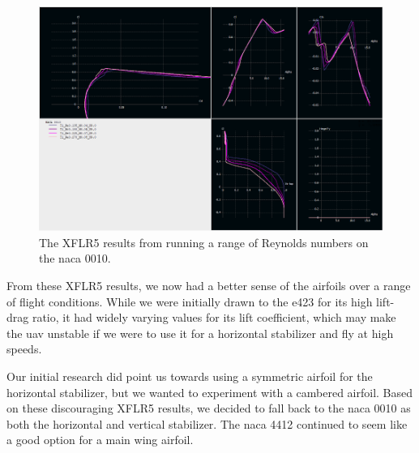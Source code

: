 \begin{figure}[htpb]
    \centering
    \includegraphics[width=\linewidth]{Figures/final_naca_0010.png}
    \caption[Final XFLR5 analysis of \acrshort{naca} 0010]{The XFLR5 results from running a range of Reynolds numbers on the \acrshort{naca} 0010.}
    \label{fig:final_naca0010}
\end{figure}

\newpage

From these XFLR5 results, we now had a better sense of the airfoils over a range of flight conditions. While we were initially drawn to the \acrshort{e}423 for its high lift-drag ratio, it had widely varying values for its lift coefficient, which may make the \acrshort{uav} unstable if we were to use it for a horizontal stabilizer and fly at high speeds.

Our initial research did point us towards using a symmetric airfoil for the horizontal stabilizer, but we wanted to experiment with a cambered airfoil. Based on these discouraging XFLR5 results, we decided to fall back to the \acrshort{naca} 0010 as both the horizontal and vertical stabilizer. The \acrshort{naca} 4412 continued to seem like a good option for a main wing airfoil.
